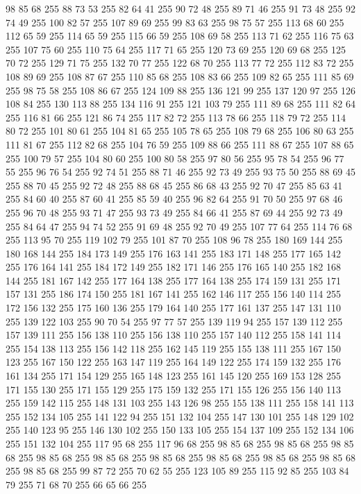 98 85 68 255 88 73 53 255 82 64 41 255 90 72 48 255 89 71 46 255 91 73 48 255 92 74 49 255 100 82 57 255 107 89 69 255 99 83 63 255 98 75 57 255 113 68 60 255 112 65 59 255 114 65 59 255 115 66 59 255 108 69 58 255 113 71 62 255 116 75 63 255 107 75 60 255 110 75 64 255 117 71 65 255 120 73 69 255 120 69 68 255 125 70 72 255 129 71 75 255 132 70 77 255 122 68 70 255 113 77 72 255 112 83 72 255 108 89 69 255 108 87 67 255 110 85 68 255 108 83 66 255 109 82 65 255 111 85 69 255 98 75 58 255 108 86 67 255 124 109 88 255 136 121 99 255 137 120 97 255 126 108 84 255 130 113 88 255 134 116 91 255 121 103 79 255 111 89 68 255 111 82 64 255 116 81 66 255 121 86 74 255 117 82 72 255 113 78 66 255 118 79 72 255 114 80 72 255 101 80 61 255 104 81 65 255 105 78 65 255 108 79 68 255 106 80 63 255 111 81 67 255 112 82 68 255 104 76 59 255 109 88 66 255 111 88 67 255 107 88 65 255 100 79 57 255
104 80 60 255 100 80 58 255 97 80 56 255 95 78 54 255 96 77 55 255 96 76 54 255 92 74 51 255 88 71 46 255 92 73 49 255 93 75 50 255 88 69 45 255 88 70 45 255 92 72 48 255 88 68 45 255 86 68 43 255 92 70 47 255 85 63 41 255 84 60 40 255 87 60 41 255 85 59 40 255 96 82 64 255 91 70 50 255 97 68 46 255 96 70 48 255 93 71 47 255 93 73 49 255 84 66 41 255 87 69 44 255 92 73 49 255 84 64 47 255 94 74 52 255 91 69 48 255 92 70 49 255 107 77 64 255 114 76 68 255 113 95 70 255 119 102 79 255 101 87 70 255 108 96 78 255 180 169 144 255 180 168 144 255 184 173 149 255 176 163 141 255 183 171 148 255 177 165 142 255 176 164 141 255 184 172 149 255 182 171 146 255 176 165 140 255 182 168 144 255 181 167 142 255 177 164 138 255 177 164 138 255 174 159 131 255 171 157 131 255 186 174 150 255 181 167 141 255 162 146 117 255 156 140 114 255 172 156 132 255 175 160 136 255 179 164 140 255 177 161 137 255 147 131 110 255
139 122 103 255 90 70 54 255 97 77 57 255 139 119 94 255 157 139 112 255 157 139 111 255 156 138 110 255 156 138 110 255 157 140 112 255 158 141 114 255 154 138 113 255 156 142 118 255 162 145 119 255 155 138 111 255 167 150 123 255 167 150 122 255 163 147 119 255 164 149 122 255 174 159 132 255 176 161 134 255 171 154 129 255 165 148 123 255 161 145 120 255 169 153 128 255 171 155 130 255 171 155 129 255 175 159 132 255 171 155 126 255 156 140 113 255 159 142 115 255 148 131 103 255 143 126 98 255 155 138 111 255 158 141 113 255 152 134 105 255 141 122 94 255 151 132 104 255 147 130 101 255 148 129 102 255 140 123 95 255 146 130 102 255 150 133 105 255 154 137 109 255 152 134 106 255 151 132 104 255 117 95 68 255 117 96 68 255 98 85 68 255 98 85 68 255 98 85 68 255 98 85 68 255 98 85 68 255 98 85 68 255 98 85 68 255 98 85 68 255 98 85 68 255 98 85 68 255 99 87 72 255 70 62 55 255 123 105 89 255 115 92 85 255 103 84 79 255 71 68 70 255 66 65 66 255

